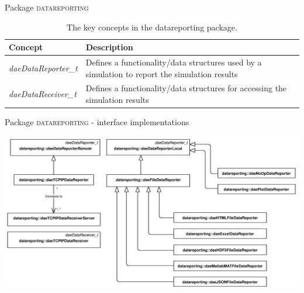 \documentclass[compress,newPxFont,sthlmFooter]{beamer}
\begin{document}
\begin{frame}{Package \textsc{datareporting}}
\scriptsize
{
\begin{table}
  \caption{The key concepts in the \alert{datareporting} package.}
  \begin{tabularx}{\linewidth}{l>{\raggedright}X}
    \toprule
    \textcolor{sthlmRed}{\textbf{Concept}} & \textcolor{sthlmRed}{\textbf{Description}} \tabularnewline
    \midrule
    \textcolor{sthlmRed}{\textit{daeDataReporter\_t}} & Defines a functionality/data structures used by a simulation to report the simulation results \tabularnewline 
    \textcolor{sthlmRed}{\textit{daeDataReceiver\_t}} & Defines a functionality/data structures for accessing the simulation results \tabularnewline
    \bottomrule
  \end{tabularx}
\end{table}
}
\end{frame}

\begin{frame}{Package \textsc{datareporting} - interface implementations}
    \begin{center}
        \includegraphics[width=0.8\paperwidth]{Supplemental_Figure_S6.png}      
    \end{center}
\end{frame}
\end{document}
